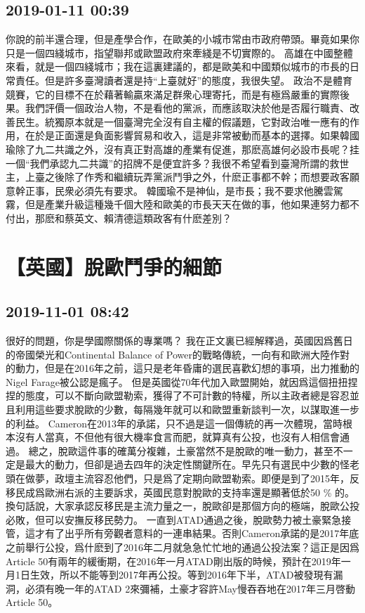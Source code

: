 \documentclass[twocolumn]{ctexart}
\begin{document}
\subsection*{2019-01-11 00:39}
你說的前半還合理，但是產學合作，在歐美的小城市常由市政府帶頭。畢竟如果你只是一個四綫城市，指望聯邦或歐盟政府來牽綫是不切實際的。 高雄在中國整體來看，就是一個四綫城市；我在這裏建議的，都是歐美和中國類似城市的市長的日常責任。但是許多臺灣讀者還是持“上臺就好”的態度，我很失望。 政治不是體育競賽，它的目標不在於藉著輸贏來滿足群衆心理寄托，而是有極爲嚴重的實際後果。我們評價一個政治人物，不是看他的黨派，而應該取決於他是否履行職責、改善民生。統獨原本就是一個臺灣完全沒有自主權的假議題，它對政治唯一應有的作用，在於是正面還是負面影響貿易和收入，這是非常被動而基本的選擇。如果韓國瑜除了九二共識之外，沒有真正對高雄的產業有促進，那麽高雄何必設市長呢？挂一個“我們承認九二共識”的招牌不是便宜許多？我很不希望看到臺灣所謂的救世主，上臺之後除了作秀和繼續玩弄黨派鬥爭之外，什麽正事都不幹；而想要政客願意幹正事，民衆必須先有要求。 韓國瑜不是神仙，是市長；我不要求他騰雲駕霧，但是產業升級這種幾千個大陸和歐美的市長天天在做的事，他如果連努力都不付出，那麽和蔡英文、賴清德這類政客有什麽差別？\section*{【英國】脫歐鬥爭的細節}
\subsection*{2019-11-01 08:42}

很好的問題，你是學國際關係的專業嗎？
我在正文裏已經解釋過，英國因爲舊日的帝國榮光和Continental Balance of Power的戰略傳統，一向有和歐洲大陸作對的動力，但是在2016年之前，這只是老年昏庸的選民喜歡幻想的事項，出力推動的Nigel Farage被公認是瘋子。
但是英國從70年代加入歐盟開始，就因爲這個扭扭捏捏的態度，可以不斷向歐盟勒索，獲得了不可計數的特權，所以主政者總是容忍並且利用這些要求脫歐的少數，每隔幾年就可以和歐盟重新談判一次，以謀取進一步的利益。
Cameron在2013年的承諾，只不過是這一個傳統的再一次體現，當時根本沒有人當真，不但他有很大機率食言而肥，就算真有公投，也沒有人相信會通過。
總之，脫歐這件事的確萬分複雜，土豪當然不是脫歐的唯一動力，甚至不一定是最大的動力，但卻是過去四年的決定性關鍵所在。早先只有選民中少數的怪老頭在做夢，政壇主流容忍他們，只是爲了定期向歐盟勒索。即便是到了2015年，反移民成爲歐洲右派的主要訴求，英國民意對脫歐的支持率還是顯著低於50 \% 的。換句話說，大家承認反移民是主流力量之一，脫歐卻是那個方向的極端，脫歐公投必敗，但可以安撫反移民勢力。
一直到ATAD通過之後，脫歐勢力被土豪緊急接管，這才有了出乎所有旁觀者意料的一連串結果。否則Cameron承諾的是2017年底之前舉行公投，爲什麽到了2016年二月就急急忙忙地的通過公投法案？這正是因爲Article 50有兩年的緩衝期，在2016年一月ATAD剛出版的時候，預計在2019年一月1日生效，所以不能等到2017年再公投。等到2016年下半，ATAD被發現有漏洞，必須有晚一年的ATAD 2來彌補，土豪才容許May慢吞吞地在2017年三月啓動Article 50。
\end{document}
